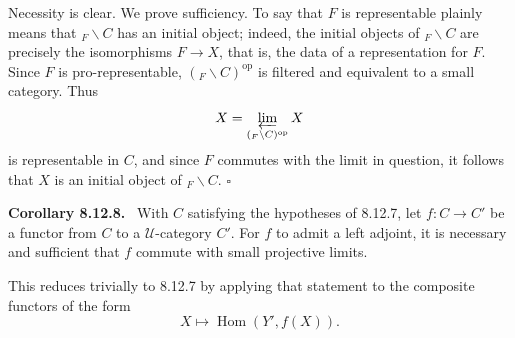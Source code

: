\documentclass[11pt]{article}
\newcommand{\U}{\mathcal{U}}
\newcommand{\Hom}{\operatorname{Hom}}
\newcommand{\op}{\mathrm{op}}
\newcommand{\qedtext}{\hfill\(\square\)}
\newenvironment{statement}[1]{\par\medskip\noindent\textbf{#1.}\ }{\par\medskip}
\begin{document}
Necessity is clear. We prove sufficiency. To say that $F$ is representable plainly means that ${}_F\backslash C$ has an initial object; indeed, the initial objects of ${}_F\backslash C$ are precisely the isomorphisms $F\to X$, that is, the data of a representation for $F$. Since $F$ is pro-representable, $({}_F\backslash C)^\op$ is filtered and equivalent to a small category. Thus
\[
 X=\varprojlim_{({}_F\backslash C)^\op} X
\]
is representable in $C$, and since $F$ commutes with the limit in question, it follows that $X$ is an initial object of ${}_F\backslash C$. \qedtext

\begin{statement}{Corollary 8.12.8}
With $C$ satisfying the hypotheses of 8.12.7, let $f:C\to C'$ be a functor from $C$ to a $\U$-category $C'$. For $f$ to admit a left adjoint, it is necessary and sufficient that $f$ commute with small projective limits.
\end{statement}

This reduces trivially to 8.12.7 by applying that statement to the composite functors of the form
\[
 X\longmapsto \Hom(Y',f(X)).
\]
\end{document}
